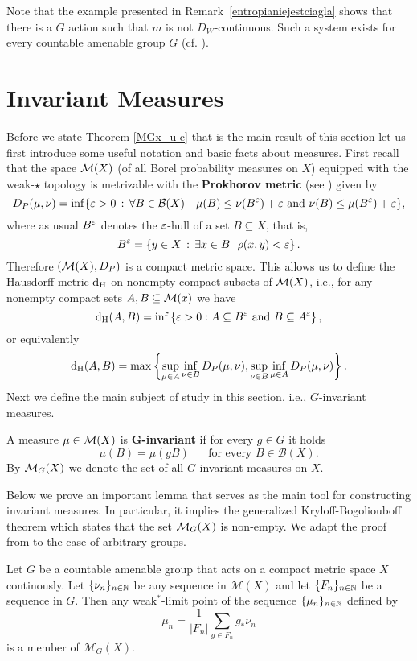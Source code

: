 \begin{rem}
Note that the example presented in Remark~\ref{entropianiejestciagla} shows that there is a $G$ action such that $m$ is not $D_W$-continuous. Such a system exists for every countable amenable group $G$ (cf. \cite[ Example 2]{DI88}).
\end{rem}


\section{Invariant Measures}\label{section:inv_measures}

Before we state Theorem \ref{MGx_u-c} that is the main result of this section let us first introduce some useful notation and  basic facts about measures.
First recall that the space $\operatorname{\mathcal{M}}(X)$ (of all Borel probability measures on $X$) equipped with the weak-$\star$ topology is metrizable with the {\bf Prokhorov metric} (see \cite{Billingsley68}) given by
\[
D_P(\mu,\nu)=\inf\{\varepsilon>0\,:\,\forall B\in\mathcal{B}(X)\quad\mu(B)\leq\nu(B^{\varepsilon})+\varepsilon \text{ and } \nu(B)\leq\mu(B^{\varepsilon})+\varepsilon\},
\]
where as usual $B^{\varepsilon}$ denotes the $\varepsilon$-hull of a set $B\subseteq X$, that is, 
\[
B^{\varepsilon}=\left\{y\in X\,:\,\exists x\in B~~\rho(x,y)< \varepsilon\right\}.
\]
Therefore $(\operatorname{\mathcal{M}}(X), D_P)$ is a compact metric space. This allows us to define the Hausdorff metric $\operatorname{d_H}$ on nonempty compact subsets of $\operatorname{\mathcal{M}}(X)$, i.e., for any nonempty compact sets $A,B\subseteq\operatorname{\mathcal{M}}(x)$ we have
\[
\operatorname{d_H}(A,B)= \inf\left\{\varepsilon>0:A\subseteq B^{\varepsilon} \text{ and } B\subseteq A^{\varepsilon}\right\},
\]
or equivalently
\[
\operatorname{d_H}(A,B)= \max\left\{\sup_{\mu\in A}\inf_{\nu\in B}D_P(\mu, \nu), \sup_{\nu\in B}\inf_{\mu\in A} D_P(\mu, \nu)\right\}.
\]
\noindent 
Next we define the main subject of study in this section, i.e., $G$-invariant measures.

\begin{defn}
A measure $\mu\in\operatorname{\mathcal{M}}(X)$ is {\bf ${\bm G}$-invariant} if for every $g\in G$ it holds
\[
\mu(B)=\mu(gB)~~~~~~ \text{ for every }B\in \mathcal{B}(X).
\]
By ${\operatorname{\mathcal{M}}_G(X)}$ we denote the set of all $G$-invariant measures on $X$.
\end{defn}
\noindent
Below we prove an important lemma that serves as the main tool for constructing invariant measures. In particular, it implies the generalized Kryloff-Bogoliouboff theorem which states that the set $\operatorname{\mathcal{M}}_G(X)$ is non-empty.
%
We adapt the proof from \cite{EW10} to the case of arbitrary groups.
\begin{lem}\label{lem:invariantMeasure}
Let $G$ be a countable amenable group that acts on a compact metric space $X$ continously. Let $\{\nu_n\}_{n\in\mathbb{N}}$ be any sequence in $\mathcal M(X)$ and let $\{F_n\}_{n\in\mathbb{N}}$ be a \Folner sequence in $G$. Then any weak$^*$-limit point of the sequence $\{\mu_n\}_{n\in\mathbb{N}}$ defined by
\[
\mu_n = \frac{1}{|F_n|}\sum_{g\in F_n}g_*\nu_n
\]
is a member of $\mathcal M_G(X)$.
\end{lem}

